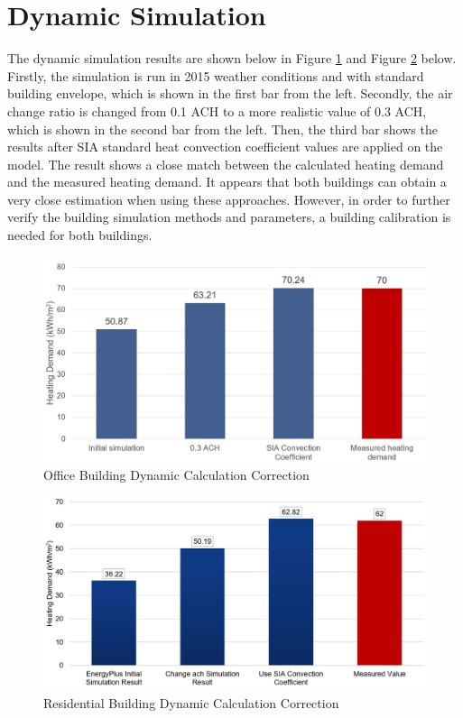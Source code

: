 \documentclass[a4paper, oneside]{discothesis}
\begin{document}
		
	\newpage		  
	\section{Dynamic Simulation}		
			The dynamic simulation results are shown below in Figure \ref{fig:Sumatra_EP} and Figure \ref{fig:Hongger_EP} below. Firstly, the simulation is run in 2015 weather conditions and with standard building envelope, which is shown in the first bar from the left. Secondly, the air change ratio is changed from 0.1 ACH to a more realistic value of 0.3 ACH, which is shown in the second bar from the left. Then, the third bar shows the results after SIA standard heat convection coefficient values are applied on the model. The result shows a close match between the calculated heating demand and the measured heating demand. It appears that both buildings can obtain a very close estimation when using these approaches. However, in order to further verify the building simulation methods and parameters, a building calibration is needed for both buildings.
		

		\begin{figure}[htbp]
		\centering
		\includegraphics[scale=0.5]{Office_EP.jpg}
		\caption{Office Building Dynamic Calculation Correction}
		\label{fig:Sumatra_EP}
		\end{figure}

		\begin{figure}[htbp]
		\centering
		\includegraphics[scale=0.4]{Residential_EP.jpg}
		\caption{Residential Building Dynamic Calculation Correction}
		\label{fig:Hongger_EP}
		\end{figure}
		
\end{document}
